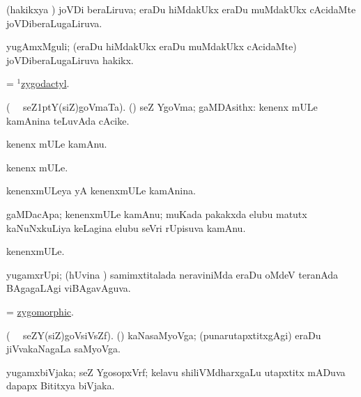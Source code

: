 \bentry
{} 
\gl{\gu} 
\bmng
(hakikxya \vi) joVDi beraLiruva; eraDu hiMdakUkx eraDu muMdakUkx cAcidaMte joVDiberaLugaLiruva.  
\emng
\eentry

\bentry
{} 
\gl{\nA} 
\bmng
yugAmxMguli; (eraDu hiMdakUkx eraDu muMdakUkx cAcidaMte) joVDiberaLugaLiruva hakikx.
\emng
\eentry

\bentry
{} 
\gl{\gu}
\bmng
= \hyperlink{zygodactyl(1)}{$^1$zygodactyl}.
\emng
\eentry

\bentry
{} 
\gl{\nA} 
\bmng
(\bava\   \ucAcx\  seZ\kern1ptY(siZ)goVmaTa).  
(\aMrashA) seZ YgoVma; gaMDAsithx: 
\banum
{}  kenenx mULe kamAnina teLuvAda  cAcike. 

 kenenx mULe kamAnu. 

 kenenx  mULe.
\eanum
\emng 
\eentry

\bentry
{} 
\gl{\gu} 
\bmng
kenenxmULeya yA kenenxmULe kamAnina.
\emng
\eentry

\bentry
{} 
\gl{\nA} 
\bmng
gaMDacApa;  kenenxmULe kamAnu; muKada pakakxda elubu  matutx kaNuNxkuLiya  keLagina elubu seVri rUpisuva kamAnu.
\emng
\eentry

\bentry
{} 
\gl{\nA} 
\bmng
kenenxmULe.
\emng
\eentry

\bentry
{} 
\gl{\gu} 
\bmng
yugamxrUpi; (hUvina \vi) samimxtitalada neraviniMda eraDu oMdeV teranAda BAgagaLAgi viBAgavAguva.
\emng
\eentry

\bentry
{} 
\gl{\gu}  
\bmng
= \hyperlink{zygomorphic}{zygomorphic}.
\emng
\eentry

\bentry
{} 
\gl{\nA} 
\bmng
(\bava\  \ucAcx\ seZY(siZ)goVsiVsZf). 
(\jiVvi) kaNasaMyoVga; (punarutapxtitxgAgi) eraDu jiVvakaNagaLa saMyoVga.
\emng
\eentry

\bentry
{}  
\gl{\nA}   
\bmng
yugamxbiVjaka; seZ YgosopxVrf; kelavu shiliVMdharxgaLu utapxtitx mADuva dapapx Bititxya biVjaka.
\emng
\eentry

